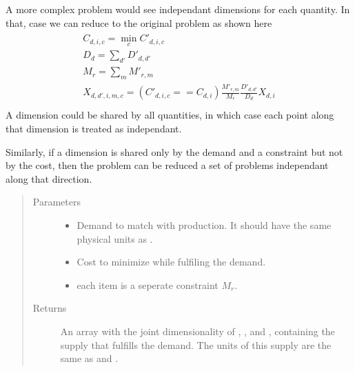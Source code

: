 \documentclass[letterpaper,10pt,english]{sphinxmanual}
\begin{document}
\begin{fulllineitems}
\begin{enumerate}
\begin{enumerate}
\begin{enumerate}
\end{enumerate}

\end{enumerate}

\end{enumerate}

A more complex problem would see independant dimensions for each quantity. In that,
case we can reduce to the original problem as shown here
\begin{align*}\!\begin{aligned}
C_{d, i, c} = \min_cC\prime_{d, i, c}\\
D_d = \sum_{d\prime} D\prime_{d, d\prime}\\
M_r = \sum_m M\prime_{r, m}\\
X_{d, d\prime, i, m, c} =
    \left(C\prime_{d, i, c} == C_{d, i}\right)
    \frac{M\prime_{r, m}}{M_r} \frac{D\prime_{d, d\prime}}{D_d} X_{d, i}\\
\end{aligned}\end{align*}
A dimension could be shared by all quantities, in which case each point along that
dimension is treated as independant.

Similarly, if a dimension is shared only by the demand and a constraint but not by
the cost, then the problem can be reduced a set of problems independant along that
direction.
\begin{quote}\begin{description}
\item[{Parameters}] \leavevmode\begin{itemize}
\item {} 
 \textendash{} Demand to match with production. It should have the same physical units
as .

\item {} 
 \textendash{} Cost to minimize while fulfiling the demand.

\item {} 
 \textendash{} each item is a seperate constraint \(M_r\).

\end{itemize}

\item[{Returns}] \leavevmode
An array with the joint dimensionality of , , and
, containing the supply that fulfills the demand. The units of this
supply are the same as  and .

\end{description}\end{quote}

\end{fulllineitems}
\end{document}
